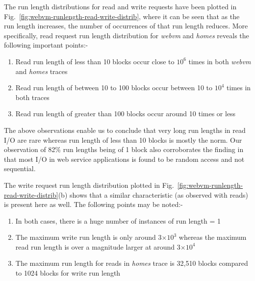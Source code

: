 The run length distributions for read and write requests have been 
plotted in Fig.~\ref{fig:webvm-runlength-read-write-distrib}, where it
can be seen that as the run length increases, the number of occurrences
of that run length reduces. More specifically, read request run length
distribution for \textit{webvm} and \textit{homes} reveals
the following important points:-
\begin{enumerate}

	\item Read run length of less than 10 blocks occur close to $10^6$
		times in both \textit{webvm} and \textit{homes} traces
	\item Read run length of between 10 to 100 blocks occur between
		10 to $10^4$ times in both traces
	\item Read run length of greater than 100 blocks occur around 10 times or less
\end{enumerate}
The above observations enable us to conclude that very long run lengths 
in read I/O are rare whereas run length of less than 10 blocks is mostly 
the norm. Our observation of 82\% run lengths being of 1 block also 
corroborates the finding in \cite{storagecharacterization} that most I/O 
in web service applications is found to be random access and not sequential.

The write request run length distribution plotted in 
Fig.~\ref{fig:webvm-runlength-read-write-distrib}(b) 
shows that a similar characteristic (as observed
with reads) is present here as well. The following points may be noted:-
\begin{enumerate}
	\item In both cases, there is a huge number of instances of run length = 1
	\item The maximum write run length is only around 3$\times 10^3$ whereas 
		the maximum read run length is over a magnitude larger at around
		3$\times 10^4$
	\item The maximum run length for reads in \textit{homes} trace is 32,510 blocks compared
      to 1024 blocks for write run length		
\end{enumerate}


